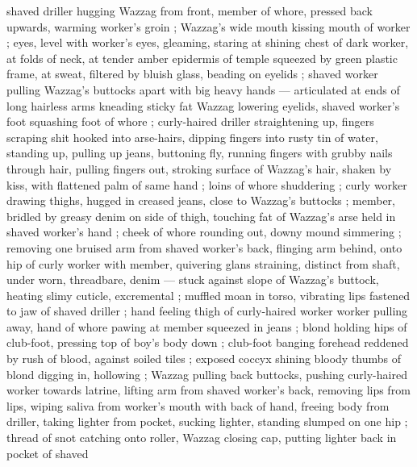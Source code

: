 shaved driller hugging Wazzag from front, member of whore, pressed back upwards, warming worker's groin ; Wazzag's wide mouth kissing mouth of worker ; eyes, level with worker's eyes, gleaming, staring at shining chest of dark worker, at folds of neck, at tender amber epidermis of temple squeezed by green plastic frame, at sweat, filtered by bluish glass, beading on eyelids ; shaved worker pulling Wazzag's buttocks apart with big heavy hands --- articulated at ends of long hairless arms {\dashcom} kneading sticky fat {\col} Wazzag lowering eyelids, shaved worker's foot squashing foot of whore ; curly-haired driller straightening up, fingers scraping shit hooked into arse-hairs, dipping fingers into rusty tin of water, standing up, pulling up jeans, buttoning fly, running fingers with grubby nails through hair, pulling fingers out, stroking surface of Wazzag's hair, shaken by kiss, with flattened palm of same hand ; loins of whore shuddering ; curly worker drawing thighs, hugged in creased jeans, close to Wazzag's buttocks ; member, bridled by greasy denim on side of thigh, touching fat of Wazzag's arse held in shaved worker's hand ; cheek of whore rounding out, downy mound simmering ; removing one bruised arm from shaved worker's back, flinging arm behind, onto hip of curly worker with member, quivering{\comdash} glans straining, distinct from shaft, under worn, threadbare, denim --- stuck against slope of Wazzag's buttock, heating slimy cuticle, excremental ; muffled moan in torso, vibrating lips fastened to jaw of shaved driller ; hand feeling thigh of curly-haired worker {\col} worker pulling away, hand of whore pawing at member squeezed in jeans ; blond holding hips of club-foot, pressing top of boy's body down ; club-foot banging forehead reddened by rush of blood, against soiled tiles ; exposed coccyx shining bloody {\col} thumbs of blond digging in, hollowing ; Wazzag pulling back buttocks, pushing curly-haired worker towards latrine, lifting arm from shaved worker's back, removing lips from lips, wiping saliva from worker's mouth with back of hand, freeing body from driller, taking lighter from pocket, sucking lighter, standing slumped on one hip ; thread of snot catching onto roller, Wazzag closing cap, putting lighter back in pocket of shaved 
